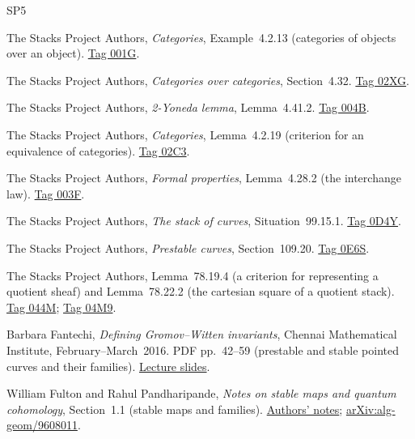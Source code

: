 \documentclass[12pt]{memoir}
\begin{document}
\begingroup
\renewcommand{\bibname}{Notes Bibliography}
\begin{thebibliography}{SP5}

The Stacks Project Authors, \emph{Categories}, Example~4.2.13 (categories of objects over an object).
\href{https://stacks.math.columbia.edu/tag/001G}{Tag 001G}.

The Stacks Project Authors, \emph{Categories over categories}, Section~4.32.
\href{https://stacks.math.columbia.edu/tag/02XG}{Tag 02XG}.

The Stacks Project Authors, \emph{2-Yoneda lemma}, Lemma~4.41.2.
\href{https://stacks.math.columbia.edu/tag/004B}{Tag 004B}.

The Stacks Project Authors, \emph{Categories}, Lemma~4.2.19 (criterion for an equivalence of categories).
\href{https://stacks.math.columbia.edu/tag/02C3}{Tag 02C3}.

The Stacks Project Authors, \emph{Formal properties}, Lemma~4.28.2 (the interchange law).
\href{https://stacks.math.columbia.edu/tag/003F}{Tag 003F}.

The Stacks Project Authors, \emph{The stack of curves}, Situation~99.15.1.
\href{https://stacks.math.columbia.edu/tag/0D4Y}{Tag 0D4Y}.

The Stacks Project Authors, \emph{Prestable curves}, Section~109.20.
\href{https://stacks.math.columbia.edu/tag/0E6S}{Tag 0E6S}.

The Stacks Project Authors, Lemma~78.19.4 (a criterion for representing a
quotient sheaf) and Lemma~78.22.2 (the cartesian square of a quotient stack).
\href{https://stacks.math.columbia.edu/tag/044M}{Tag 044M};
\href{https://stacks.math.columbia.edu/tag/04M9}{Tag 04M9}.

Barbara Fantechi, \emph{Defining Gromov--Witten invariants}, Chennai Mathematical Institute, February--March~2016.
PDF pp.~42--59 (prestable and stable pointed curves and their families).
\href{https://www.cmi.ac.in/~mathsem/fantechi2016/chennai_2016_1.pdf}{Lecture slides}.

William Fulton and Rahul Pandharipande, \emph{Notes on stable maps and quantum cohomology}, Section~1.1 (stable maps and families).
\href{https://people.math.ethz.ch/~rahul/sm.pdf}{Authors' notes};
\href{https://arxiv.org/abs/alg-geom/9608011}{arXiv:alg-geom/9608011}.


\end{thebibliography}
\end{document}
